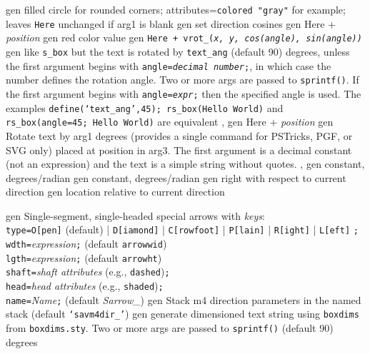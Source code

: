   {gen}%
  {filled circle for rounded corners; attributes={\tt colored "gray"}
   for example; leaves {\tt Here} unchanged if arg1 is blank
    }%
%
  {gen}%
  {set direction cosines}%
%
  {gen}%
  {Here + {\sl position}}%
%
  {gen}%
  {red color value}%
%
  {gen}%
  {\tt Here + vrot\_({\sl x, y, cos(angle), sin(angle))}}%
%
  {gen}%
  {like {\tt s\_box} but the text is rotated by {\tt text\_ang}%
   (default 90) degrees, unless
   the first argument begins with {\tt angle={\sl decimal number};},
   in which case the number defines the rotation angle.
   Two or more args are passed to {\tt sprintf()}.
   If the first argument begins with {\tt angle={\sl expr};} then
   the specified angle is used.
   The examples {\tt define(`text\_ang',45); rs\_box(Hello World)} and
   {\tt rs\_box(angle=45; Hello World)} are equivalent
   , }%
%
  {gen}%
  {Here + {\sl position}}%
%
  {gen}%
  {Rotate text by arg1 degrees (provides a single command for
   PSTricks, PGF, or SVG only) placed at position in arg3.
   The first argument is a decimal constant (not an expression) and
   the text is a simple string without quotes.
   , }%
%
  {gen}%
  {constant, degrees/radian}%
%
  {gen}%
  {constant, degrees/radian}%
%
  {gen}%
  {right with respect to current direction}%
%
  {gen}%
  {location relative to current direction}%

%

%
  {gen}%
  {Single-segment, single-headed special arrows with {\sl keys}:\\
       {\tt type=}{\tt O[pen]} (default)
          | {\tt D[iamond]} | {\tt C[rowfoot]} | {\tt P[lain]}
          | {\tt R[ight]} | {\tt L[eft]} {\tt ;}\\
       {\tt wdth=}{\sl expression}{\tt ;} (default {\tt arrowwid})\\
       {\tt lgth=}{\sl expression}{\tt ;} (default {\tt arrowht})\\
       {\tt shaft=}{\sl shaft attributes} (e.g., {\tt dashed}){\tt ;}\\
       {\tt head=}{\sl head attributes} (e.g., {\tt shaded}){\tt ;}\\
       {\tt name=}{\sl Name}{\tt ;} (default {\sl Sarrow\_})
  }%
%
  {gen}%
  {Stack m4 direction parameters in the named stack
    (default {\tt `savm4dir\_'})}%
%
  {gen}%
  {generate dimensioned text string using {\tt{}boxdims} from
    {\tt boxdims.sty}. Two or more args are passed to {\tt sprintf()}
   (default 90) degrees }%

